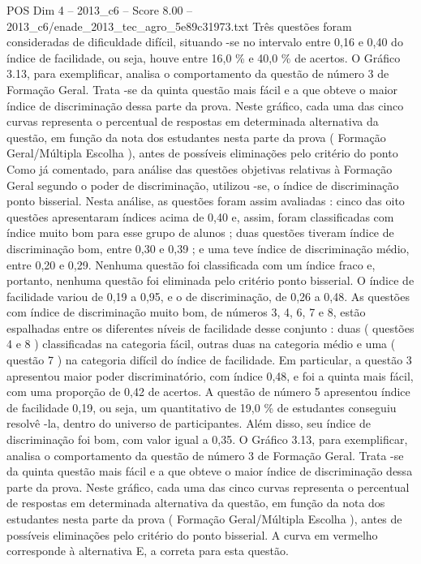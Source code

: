 \begin{textsample}{POS Dim 4 – 2013\_c6 – Score 8.00 – 2013\_c6/enade\_2013\_tec\_agro\_5e89c31973.txt}
Três questões foram consideradas de dificuldade difícil, situando -se no intervalo entre 0,16 e 0,40 do índice de facilidade, ou seja, houve entre 16,0 \% e 40,0 \% de acertos.
O Gráfico 3.13, para exemplificar, analisa o comportamento da questão de número 3 de Formação Geral.
Trata -se da quinta questão mais fácil e a que obteve o maior índice de discriminação dessa parte da prova.
Neste gráfico, cada uma das cinco curvas representa o percentual de respostas em determinada alternativa da questão, em função da nota dos estudantes nesta parte da prova ( Formação Geral/Múltipla Escolha ), antes de possíveis eliminações pelo critério do ponto Como já comentado, para análise das questões objetivas relativas à Formação Geral segundo o poder de discriminação, utilizou -se, o índice de discriminação ponto bisserial.
Nesta análise, as questões foram assim avaliadas : cinco das oito questões apresentaram índices acima de 0,40 e, assim, foram classificadas com índice muito bom para esse grupo de alunos ; duas questões tiveram índice de discriminação bom, entre 0,30 e 0,39 ; e uma teve índice de discriminação médio, entre 0,20 e 0,29.
Nenhuma questão foi classificada com um índice fraco e, portanto, nenhuma questão foi eliminada pelo critério ponto bisserial.
O índice de facilidade variou de 0,19 a 0,95, e o de discriminação, de 0,26 a 0,48.
As questões com índice de discriminação muito bom, de números 3, 4, 6, 7 e 8, estão espalhadas entre os diferentes níveis de facilidade desse conjunto : duas ( questões 4 e 8 ) classificadas na categoria fácil, outras duas na categoria médio e uma ( questão 7 ) na categoria difícil do índice de facilidade.
Em particular, a questão 3 apresentou maior poder discriminatório, com índice 0,48, e foi a quinta mais fácil, com uma proporção de 0,42 de acertos.
A questão de número 5 apresentou índice de facilidade 0,19, ou seja, um quantitativo de 19,0 \% de estudantes conseguiu resolvê -la, dentro do universo de participantes.
Além disso, seu índice de discriminação foi bom, com valor igual a 0,35.
O Gráfico 3.13, para exemplificar, analisa o comportamento da questão de número 3 de Formação Geral.
Trata -se da quinta questão mais fácil e a que obteve o maior índice de discriminação dessa parte da prova.
Neste gráfico, cada uma das cinco curvas representa o percentual de respostas em determinada alternativa da questão, em função da nota dos estudantes nesta parte da prova ( Formação Geral/Múltipla Escolha ), antes de possíveis eliminações pelo critério do ponto bisserial.
A curva em vermelho corresponde à alternativa E, a correta para esta questão.

\end{textsample}
